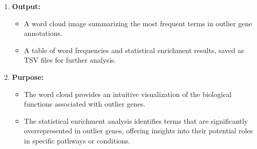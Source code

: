 \documentclass{article}
\begin{document}
\begin{enumerate}
    \item \textbf{Output:}
    \begin{itemize}
        \item A word cloud image summarizing the most frequent terms in outlier gene annotations.
        \item A table of word frequencies and statistical enrichment results, saved as TSV files for further analysis.
    \end{itemize}

    \item \textbf{Purpose:}
    \begin{itemize}
        \item The word cloud provides an intuitive visualization of the biological functions associated with outlier genes.
        \item The statistical enrichment analysis identifies terms that are significantly overrepresented in outlier genes, offering insights into their potential roles in specific pathways or conditions.
    \end{itemize}
\end{enumerate}
\end{document}
